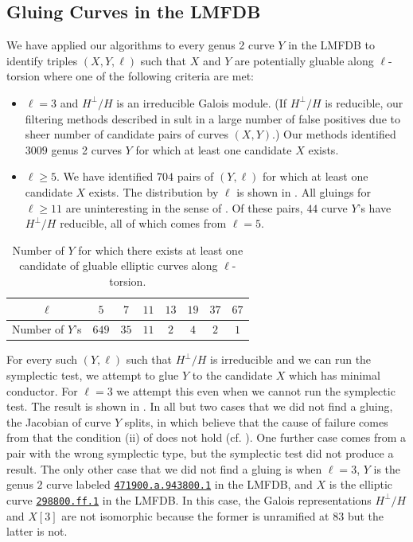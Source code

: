 \documentclass{amsproc}
\numberwithin{equation}{section}
\theoremstyle{definition}
\theoremstyle{remark}
\begin{document}
\subsection{Gluing Curves in the LMFDB}

We have applied our algorithms to every genus 2 curve $Y$ in the LMFDB to identify triples $(X, Y, \ell)$ such that $X$ and $Y$ are potentially gluable along $\ell$-torsion where one of the following criteria are met:
\begin{itemize}
    \item $\ell = 3$ and $H^\perp/H$ is an irreducible Galois module. (If $H^\perp/H$ is reducible, our filtering methods described in  sult in a large number of false positives due to sheer number of candidate pairs of curves $(X,Y)$.) Our methods identified $3009$ genus 2 curves $Y$ for which at least one candidate $X$ exists.
    \item $\ell \ge 5$. We have identified $704$ pairs of $(Y,\ell)$ for which at least one candidate $X$ exists.
    The distribution by $\ell$ is shown in .
    All gluings for $\ell\geq 11$ are uninteresting in the sense of . Of these pairs, $44$ curve $Y$'s have $H^\perp/H$ reducible, all of which comes from $\ell=5$.
\end{itemize}
\begin{table}[ht]
\begin{tabular}{c|ccccccc}
    $\ell$ & $5$ & $7$ & $11$ & $13$ & $19$ & $37$ & $67$ \\ \hline
    Number of $Y$'s & $649$ & $35$ & $11$ & $2$ & $4$ & $2$ & $1$
\end{tabular}
\caption{Number of $Y$ for which there exists at least one candidate of gluable elliptic curves along $\ell$-torsion.}
\label{table:gluable_l_stats}
\end{table}
For every such $(Y, \ell)$ such that $H^\perp/H$ is irreducible and we can run the symplectic test, we attempt to glue $Y$ to the candidate $X$ which has minimal conductor. For $\ell = 3$ we attempt this even when we cannot run the symplectic test.
The result is shown in .
In all but two cases that we did not find a gluing, the Jacobian of curve $Y$ splits, in which believe that the cause of failure comes from that the condition (ii) of  does not hold (cf. ). One further case comes from a pair with the wrong symplectic type, but the symplectic test did not produce a result.
The only other case that we did not find a gluing is when $\ell=3$, $Y$ is the genus $2$ curve labeled \href{https://www.lmfdb.org/Genus2Curve/Q/471900/a/943800/1}{\texttt{471900.a.943800.1}} in the LMFDB, and $X$ is the elliptic curve \href{https://www.lmfdb.org/EllipticCurve/Q/298800/ff/1}{\texttt{298800.ff.1}} in the LMFDB. 
In this case, the Galois representations $H^\perp/H$ and $X[3]$ are not isomorphic because the former is unramified at $83$ but the latter is not.
\end{document}
